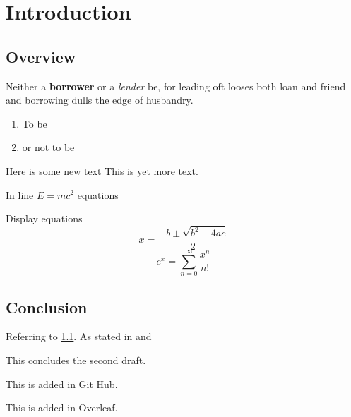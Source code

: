 \chapter{Introduction}

\section{Overview}
\label{Sec:Overview}

Neither a \textbf{borrower} or a \textit{lender} be, for leading oft looses both loan and friend and borrowing dulls the edge of husbandry.
\begin{enumerate}
\item To be
\item or not to be

\end{enumerate}

Here is some new text This is yet more text.

In line $E=mc^2$ equations

Display equations
\[
x=\frac{-b\pm\sqrt{b^2-4ac}}{2}
\]
\[
e^x = \sum_{n=0}^\infty\frac{x^n}{n!}
\]
\section{Conclusion}

Referring to \ref{Sec:Overview}. As stated in \cite[Section 2]{Bunce1992TheAlgebra} and \cite{Kaup1977AlgebraicBanachmanifolds}

This concludes the second draft.

This is added in Git Hub.

This is added in Overleaf.
